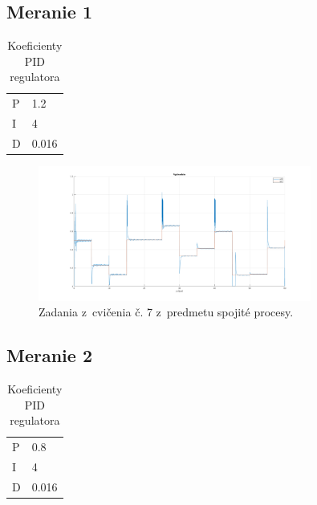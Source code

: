 \documentclass{article}
\begin{document}
\clearpage

\subsection{Meranie 1}
\label{sec:meranie1}

\begin{table}[!htbp]
	\caption{Koeficienty PID regulatora}
	\label{tab:t1}
	\begin{center}
		\begin{tabular}[c]{|l|l|}
			\hline
			P & 1.2 \\
			I & 4 \\
			D & 0.016 \\
			\hline
		\end{tabular}
	\end{center}
\end{table}


\begin{figure}[!htbp]
	\begin{center}
		\includegraphics[width=0.8\textwidth]{./include/m2.png}
	\end{center}
	\caption{Zadania z~cvičenia č. 7 z~predmetu spojité procesy.}
	\label{fig:meranie1}
\end{figure}

\clearpage

\subsection{Meranie 2}
\label{sec:meranie2}

\begin{table}[!htbp]
	\caption{Koeficienty PID regulatora}
	\label{tab:t2}
	\begin{center}
		\begin{tabular}[c]{|l|l|}
			\hline
			P & 0.8 \\
			I & 4 \\
			D & 0.016 \\
			\hline
		\end{tabular}
	\end{center}
\end{table}
\end{document}
